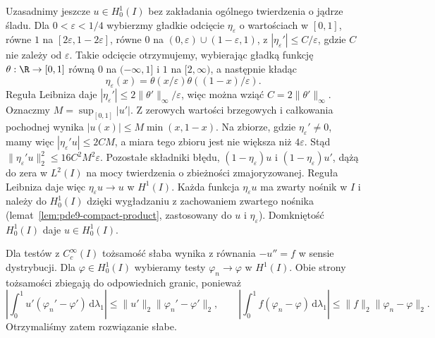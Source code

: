 \begin{przyklad}
Uzasadnimy jeszcze $u\in H_0^1(I)$ bez zakładania
ogólnego twierdzenia o jądrze śladu. Dla
$0<\varepsilon<1/4$ wybierzmy gładkie odcięcie
$\eta_\varepsilon$ o wartościach w $[0,1]$, równe
$1$ na $[2\varepsilon,1-2\varepsilon]$, równe $0$
na $(0,\varepsilon)\cup(1-\varepsilon,1)$,
z $|\eta_\varepsilon'|\le C/\varepsilon$,
gdzie $C$ nie zależy od $\varepsilon$.
Takie odcięcie otrzymujemy, wybierając gładką
funkcję $\theta:\R\to[0,1]$ równą $0$ na
$(-\infty,1]$ i $1$ na $[2,\infty)$, a następnie
kładąc
\[
 \eta_\varepsilon(x)=
 \theta(x/\varepsilon)\theta((1-x)/\varepsilon).
\]
Reguła Leibniza daje
$|\eta_\varepsilon'|\le 2\|\theta'\|_\infty/\varepsilon$,
więc można wziąć $C=2\|\theta'\|_\infty$.
Oznaczmy $M=\sup_{[0,1]}|u'|$. Z zerowych wartości
brzegowych i całkowania pochodnej wynika
$|u(x)|\le M\min(x,1-x)$. Na zbiorze, gdzie
$\eta_\varepsilon'\ne0$, mamy więc
$|\eta_\varepsilon' u|\le 2CM$, a miara tego zbioru
jest nie większa niż $4\varepsilon$. Stąd
$\|\eta_\varepsilon' u\|_2^2\le16 C^2M^2\varepsilon$.
Pozostałe składniki błędu,
$(1-\eta_\varepsilon)u$ i $(1-\eta_\varepsilon)u'$,
dążą do zera w $L^2(I)$ na mocy twierdzenia o
zbieżności zmajoryzowanej. Reguła Leibniza daje więc
$\eta_\varepsilon u\to u$ w $H^1(I)$.
Każda funkcja $\eta_\varepsilon u$ ma zwarty nośnik
w $I$ i należy do $H_0^1(I)$ dzięki wygładzaniu
z zachowaniem zwartego nośnika
(lemat~\ref{lem:pde9-compact-product}, zastosowany do
$u$ i $\eta_\varepsilon$). Domkniętość $H_0^1(I)$
daje $u\in H_0^1(I)$.

Dla testów z $C_c^\infty(I)$ tożsamość słaba wynika
z równania $-u''=f$ w sensie dystrybucji. Dla
$\varphi\in H_0^1(I)$ wybieramy testy $\varphi_n\to\varphi$
w $H^1(I)$. Obie strony tożsamości zbiegają do
odpowiednich granic, ponieważ
\[
 \left|\int_0^1u'(\varphi_n'-\varphi')\,\mathrm d\lambda_1\right|
 \le \|u'\|_2\|\varphi_n'-\varphi'\|_2,\qquad
 \left|\int_0^1f(\varphi_n-\varphi)\,\mathrm d\lambda_1\right|
 \le \|f\|_2\|\varphi_n-\varphi\|_2.
\]
Otrzymaliśmy zatem rozwiązanie słabe.


\end{przyklad}
